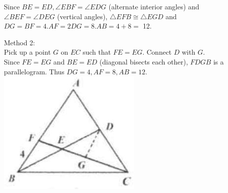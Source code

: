 \documentclass{article}
\begin{document}
Since \(B E=E D, \angle E B F=\angle E D G\) (alternate interior angles) and \(\angle B E F=\angle D E G\) (vertical angles), \(\triangle E F B \cong \triangle E G D\) and \(D G=B F=4 . A F=2 D G=8 . A B=4+8=\) 12.

Method 2:\\
Pick up a point \(G\) on \(E C\) such that \(F E=E G\). Connect \(D\) with \(G\).\\
Since \(F E=E G\) and \(B E=E D\) (diagonal bisects each other), \(F D G B\) is a parallelogram. Thus \(D G=4, A F=8, A B=12\).\\
\centering
\includegraphics[width=\textwidth]{images/132(1).jpg}
\end{document}
